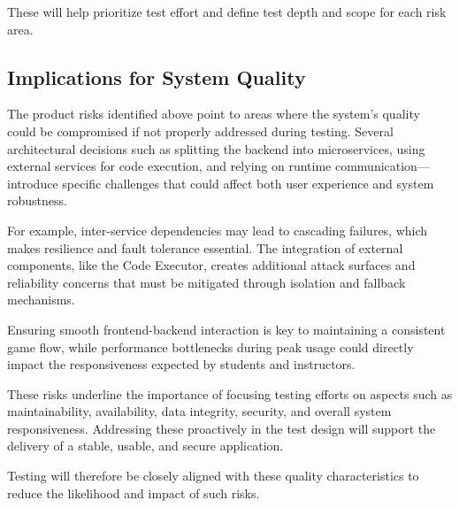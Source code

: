 These will help prioritize test effort and define test depth and scope for each risk area.

\subsection*{Implications for System Quality}

The product risks identified above point to areas where the system’s quality could be compromised if not properly addressed during testing. Several architectural decisions such as splitting the backend into microservices, using external services for code execution, and relying on runtime communication—introduce specific challenges that could affect both user experience and system robustness.

For example, inter-service dependencies may lead to cascading failures, which makes resilience and fault tolerance essential. The integration of external components, like the Code Executor, creates additional attack surfaces and reliability concerns that must be mitigated through isolation and fallback mechanisms.

Ensuring smooth frontend-backend interaction is key to maintaining a consistent game flow, while performance bottlenecks during peak usage could directly impact the responsiveness expected by students and instructors.

These risks underline the importance of focusing testing efforts on aspects such as maintainability, availability, data integrity, security, and overall system responsiveness. Addressing these proactively in the test design will support the delivery of a stable, usable, and secure application.

Testing will therefore be closely aligned with these quality characteristics to reduce the likelihood and impact of such risks.

